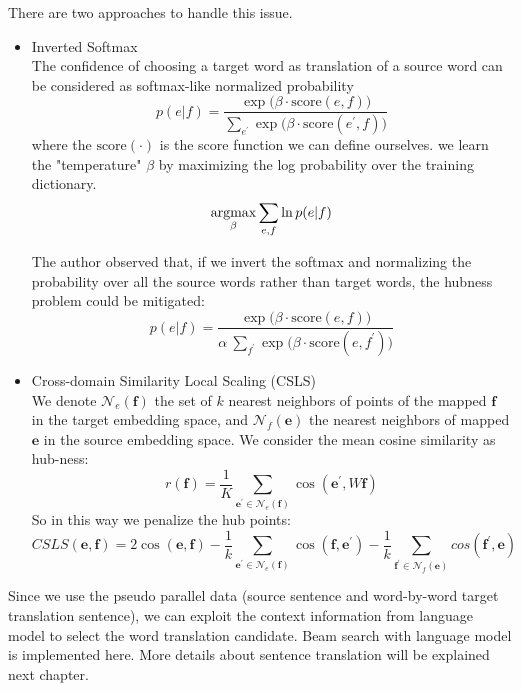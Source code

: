 There are two approaches to handle this issue.
\begin{itemize}
	\item Inverted Softmax\\
	The confidence of choosing a target word as translation of a source word can be considered as softmax-like normalized probability
	\[ p(e|f) = \frac{\exp{\Big(\beta \cdot  \text{score}(e,f)\Big)}}{\sum_{e^{\prime}} {\exp{\Big(\beta \cdot \text{score}(e^{\prime}, f)\Big)}}} \]
	where the $\text{score}(\cdot)$ is the score function we can define ourselves.
	we learn the "temperature" $\beta$ by maximizing the log probability over the training dictionary. 
	\[ \underset{\beta}{\operatorname{argmax}} \sum_{e,f} \ln p(e|f)  \]
	
	The author observed that, if we invert the softmax and normalizing the probability over all the source words rather than target words, the hubness problem could be mitigated:
	\[ p(e|f) = \frac{\exp{\Big(\beta \cdot  \text{score}(e,f)\Big)}}{\alpha \  \sum_{f^{\prime}} {\exp{\Big(\beta \cdot \text{score}(e, f^{\prime})\Big)}}}\]
	\item  Cross-domain Similarity Local Scaling (CSLS)\\
	We denote ${\mathcal{N}_e(\bm{f})}$ the set of ${k}$ nearest neighbors of points of the mapped $\bm{f}$ in the target embedding space, and ${\mathcal{N}_f(\bm{e})}$ the nearest neighbors of mapped ${\bm{e}}$ in the source embedding space. We consider the mean cosine similarity as hub-ness:
	\[ r(\bm{f})= \frac{1}{K} \sum_{\bm{e}^{\prime} \in \mathcal{N}_e(\bm{f})} \cos(\bm{e}^{\prime}, W\bm{f})\]
	So in this way we penalize the hub points:
	\[ CSLS(\bm{e}, \bm{f}) = 2 \cos(\bm{e}, \bm{f}) - \frac{1}{k} \sum_{\bm{e^{\prime}} \in \mathcal{N}_e(\bm{f})} \cos(\bm{f}, \bm{e^{\prime}})- \frac{1}{k} \sum_{\bm{f^{\prime}} \in \mathcal{N}_f(\bm{e})} cos(\bm{f^{\prime}}, \bm{e}) \]
\end{itemize}


Since we use the pseudo parallel data (source sentence and word-by-word target translation sentence), we can exploit the context information from language model to select the word translation candidate. Beam search with language model is implemented here. More details about sentence translation will be explained next chapter.\\



